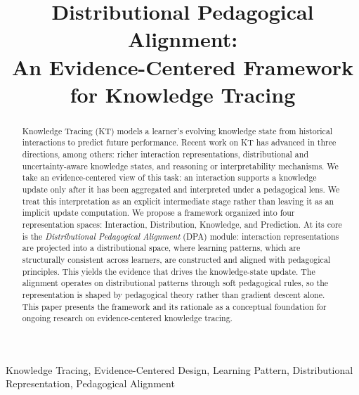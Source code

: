 \documentclass[conference]{IEEEtran}
\begin{document}
\title{Distributional Pedagogical Alignment:\\An Evidence-Centered Framework for Knowledge Tracing}

\author{%
\and
{}
}

\maketitle

\begin{abstract}
Knowledge Tracing (KT) models a learner's evolving knowledge state from historical interactions to predict future performance. Recent work on KT has advanced in three directions, among others: richer interaction representations, distributional and uncertainty-aware knowledge states, and reasoning or interpretability mechanisms. We take an evidence-centered view of this task: an interaction supports a knowledge update only after it has been aggregated and interpreted under a pedagogical lens. We treat this interpretation as an explicit intermediate stage rather than leaving it as an implicit update computation. We propose a framework organized into four representation spaces: Interaction, Distribution, Knowledge, and Prediction. At its core is the \emph{Distributional Pedagogical Alignment} (DPA) module: interaction representations are projected into a distributional space, where learning patterns, which are structurally consistent across learners, are constructed and aligned with pedagogical principles. This yields the evidence that drives the knowledge-state update. The alignment operates on distributional patterns through soft pedagogical rules, so the representation is shaped by pedagogical theory rather than gradient descent alone. This paper presents the framework and its rationale as a conceptual foundation for ongoing research on evidence-centered knowledge tracing.
\end{abstract}

\begin{IEEEkeywords}
Knowledge Tracing, Evidence-Centered Design, Learning Pattern, Distributional Representation, Pedagogical Alignment
\end{IEEEkeywords}
\end{document}

